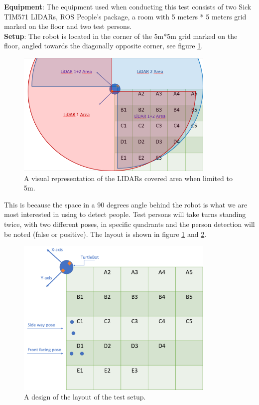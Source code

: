 \textbf{Equipment}: The equipment used when conducting this test consists of two Sick TIM571 LIDARs, ROS People's package, a room with 5 meters * 5 meters grid marked on the floor and two test persons.\\

\textbf{Setup}: The robot is located in the corner of the 5m*5m grid marked on the floor, angled towards the diagonally opposite corner, see figure \ref{fig:LidarCoverage}. 

\begin{figure}[H]
    \centering
    \includegraphics[width=0.85\textwidth]{figures/LidarCoverage.png}
    \caption{A visual representation of the LIDARs covered area when limited to 5m.}
    \label{fig:LidarCoverage}
\end{figure}

This is because the space in a 90 degrees angle behind the robot is what we are most interested in using to detect people. Test persons will take turns standing twice, with two different poses, in specific quadrants and the person detection will be noted (false or positive). The layout is shown in figure \ref{fig:LidarCoverage} and \ref{fig:LegDetectorSetup}. 

\begin{figure}[H]
    \centering
    \includegraphics[width=0.85\textwidth]{figures/LegDetectorSetup.png}
    \caption{A design of the layout of the test setup.}
    \label{fig:LegDetectorSetup}
\end{figure}

